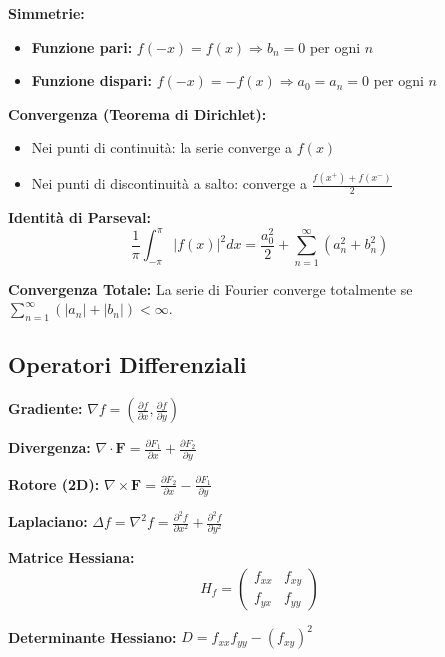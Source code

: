 \begin{info}
\textbf{Simmetrie:}
\begin{itemize}
    \item \textbf{Funzione pari:} $f(-x) = f(x) \Rightarrow b_n = 0$ per ogni $n$
    \item \textbf{Funzione dispari:} $f(-x) = -f(x) \Rightarrow a_0 = a_n = 0$ per ogni $n$
\end{itemize}

\textbf{Convergenza (Teorema di Dirichlet):}
\begin{itemize}
    \item Nei punti di continuità: la serie converge a $f(x)$
    \item Nei punti di discontinuità a salto: converge a $\frac{f(x^+) + f(x^-)}{2}$
\end{itemize}

\textbf{Identità di Parseval:}
\[ \frac{1}{\pi} \int_{-\pi}^{\pi} |f(x)|^2 dx = \frac{a_0^2}{2} + \sum_{n=1}^{\infty} (a_n^2 + b_n^2) \]

\textbf{Convergenza Totale:}
La serie di Fourier converge totalmente se $\sum_{n=1}^{\infty} (|a_n| + |b_n|) < \infty$.
\end{info}

\subsection{Operatori Differenziali}

\begin{info}
\textbf{Gradiente:} $\nabla f = \left(\frac{\partial f}{\partial x}, \frac{\partial f}{\partial y}\right)$

\textbf{Divergenza:} $\nabla \cdot \mathbf{F} = \frac{\partial F_1}{\partial x} + \frac{\partial F_2}{\partial y}$

\textbf{Rotore (2D):} $\nabla \times \mathbf{F} = \frac{\partial F_2}{\partial x} - \frac{\partial F_1}{\partial y}$

\textbf{Laplaciano:} $\Delta f = \nabla^2 f = \frac{\partial^2 f}{\partial x^2} + \frac{\partial^2 f}{\partial y^2}$

\textbf{Matrice Hessiana:}
\[ H_f = \begin{pmatrix} 
f_{xx} & f_{xy} \\ 
f_{yx} & f_{yy} 
\end{pmatrix} \]

\textbf{Determinante Hessiano:} $D = f_{xx}f_{yy} - (f_{xy})^2$
\end{info}

